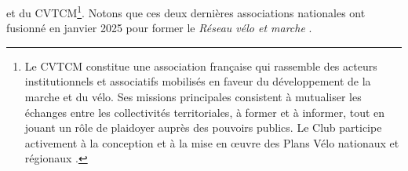 \begin{refsegment}
{} et du \acrfull{CVTCM}\footnote{
    Le \acrfull{CVTCM} constitue une association française qui rassemble des acteurs institutionnels et associatifs mobilisés en faveur du développement de la marche et du vélo. Ses missions principales consistent à mutualiser les échanges entre les collectivités territoriales, à former et à informer, tout en jouant un rôle de plaidoyer auprès des pouvoirs publics. Le Club participe activement à la conception et à la mise en œuvre des Plans Vélo nationaux et régionaux \textcolor{blue}{\autocite{club_des_villes_et_territoires_cyclables_et_marchables_club_2024}}.
}. Notons que ces deux dernières associations nationales ont fusionné en janvier 2025 pour former le \textsl{Réseau vélo et marche} \textcolor{blue}{\autocite{club_des_villes_et_territoires_cyclables_et_marchables_club_2024}}.%


\end{refsegment}
